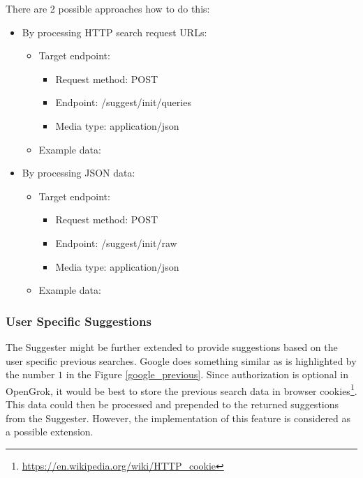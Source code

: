 There are 2 possible approaches how to do this:
\begin{itemize}
    \item By processing HTTP search request URLs:
        \begin{itemize}
            \item Target endpoint:
            \begin{itemize}
                \item Request method: POST
                \item Endpoint: /suggest/init/queries
                \item Media type: application/json
            \end{itemize}
            \item Example data:
\begin{code}
["http://demo.opengrok.org/search?project=opengrok\&q=test"]
\end{code}
        \end{itemize}
    \item By processing JSON data:
        \begin{itemize}
            \item Target endpoint:
            \begin{itemize}
                \item Request method: POST
                \item Endpoint: /suggest/init/raw
                \item Media type: application/json
            \end{itemize}
            \item Example data:
\begin{code}
\end{code}
        \end{itemize}
\end{itemize}

\subsubsection{User Specific Suggestions}
The Suggester might be further extended to provide suggestions based on the user specific previous searches. Google does
something similar as is highlighted by the number $1$ in the Figure \ref{google_previous}. Since authorization is optional
in OpenGrok, it would be best to store the previous search data in browser
cookies\footnote{\url{https://en.wikipedia.org/wiki/HTTP_cookie}}. This data could then be processed and
prepended to the returned suggestions from the Suggester.
However, the implementation of this feature is considered as a possible extension.

